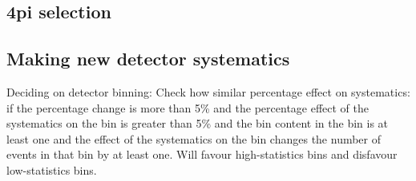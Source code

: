 \subsection{4pi selection}

\subsection{Making new detector systematics}

Deciding on detector binning: 
Check how similar percentage effect on systematics: if the percentage change is more than 5\% and the percentage effect of the systematics on the bin is greater than 5\% and the bin content in the bin is at least one and the effect of the systematics on the bin changes the number of events in that bin by at least one.
Will favour high-statistics bins and disfavour low-statistics bins.

